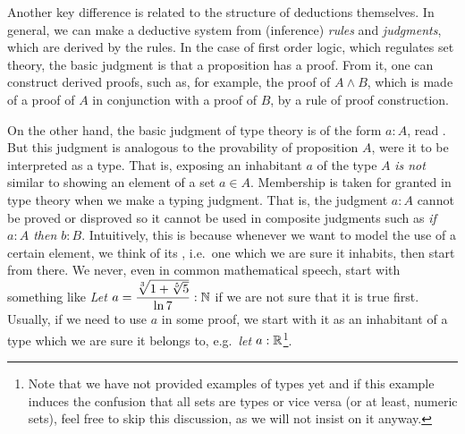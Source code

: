 Another key difference is related to the structure of deductions themselves.
In general, we can make a deductive system from (inference) \emph{rules}
and \emph{judgments}, which are derived by the rules. In the case of
first order logic, which regulates set theory, the basic judgment is
that a proposition has a proof. From it, one can construct derived proofs,
such as, for example, the proof of $ A \land B $, which is made of a proof
of $ A $ in conjunction with a proof of $ B $, by a rule of proof construction.

On the other hand, the basic judgment of type theory is of the form $ a : A $,
read . But this judgment is analogous
to the provability of proposition $ A $, were it to be interpreted as a type.
That is, exposing an inhabitant $ a $ of the type $ A $ \emph{is not} similar to
showing an element of a set $ a \in A $. Membership is taken for granted in type
theory when we make a typing judgment. That is, the judgment $ a : A $ cannot
be proved or disproved so it cannot be used in composite judgments such as
\emph{if $ a : A $ then $ b : B $}. Intuitively, this is because whenever we
want to model the use of a certain element, we think of its ,
i.e.\ one which we are sure it inhabits, then start from there. We never,
even in common mathematical speech, start with something like
\emph{Let $ a = \dfrac{\sqrt[3]{1 + \sqrt[5]{5}}}{\ln 7} : \mathbb{N} $} if we are not sure
that it is true first. Usually, if we need to use $ a $ in some proof,
we start with it as an inhabitant of a type which we are sure it belongs to,
e.g.\ \emph{let $ a : \mathbb{R} $}\footnote{Note that we have not provided examples
  of types yet and if this example induces the confusion that all sets are
  types or vice versa (or at least, numeric sets), feel free to skip this
  discussion, as we will not insist on it anyway.}.

